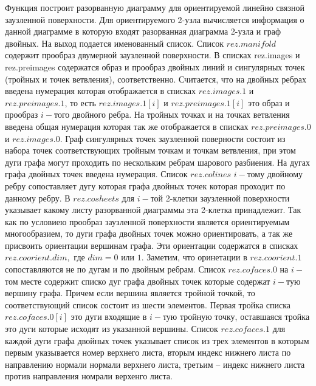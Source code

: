 \documentclass[a4paper,11pt]{report}
\begin{document}
{{{ Функция
построит
разорванную
диаграмму
для
ориентируемой
линейно
связной
заузленной
поверхности.
Для
ориентируемого
2-узла
вычисляется
информация
о
данной
диаграмме
в
которую
входят
разорванная
диаграмма
2-узла и
граф
двойных.
На
выход
подается
именованный
список.
Список $rez.manifold$ содержит
прообраз
двумерной
заузленной
поверхности.
В
списках
rez.images и rez.preimages
содержатся
образ
и
прообраз
двойных
линий
и
сингулярных
точек
(тройных
и
точек
ветвления),
соответственно.
Считается,
что на
двойных
ребрах
введена
нумерация
которая
отображается
в
списках $rez.images.1$ и $rez.preimages.1$, то
есть $rez.images.1[i]$ и $rez.preimages.1[i]$ это
образ
и
прообраз $i-$того
двойного
ребра.
На
тройных
точках
и на
точках
ветвления
введена
общая
нумерация
которая
так же
отображается
в
списках $rez.preimages.0$ и $rez.images.0.$ Граф
сингулярных
точек
заузленной
поверности
состоит
из
набора
точек
соответствующих
тройным
точкам
и
точкам
ветвления,
при
этом
дуги
графа
могут
проходить
по
нескольким
ребрам
шарового
разбиения.
На
дугах
графа
двойных
точек
введена
нумерация.
Список $rez.colines$ $i-$тому
двойному
ребру
сопоставляет
дугу
которая
графа
двойных
точек
которая
проходит
по
данному
ребру.
В $rez.cosheets$ для $i-$той
2-клетки
заузленной
поверхности
указывает
какому
листу
разорванной
диаграммы
эта
2-клетка
принадлежит.
Так
как по
условиею
прообраз
заузленной
поверхности
является
ориентируемым
многообразием,
то
дуги
графа
двойных
точек
можно
ориентировать,
а так
же
присвоить
ориентации
вершинам
графа.
Эти
ориентации
содержатся
в
списках $rez.coorient.dim,$ где $dim=0$ или $1.$ Заметим,
что
оринетации
в $rez.coorient.1$ сопоставляются
не по
дугам
и по
двойным
ребрам.
Список $rez.cofaces.0$ на $i-$том
месте
содержит
списко
дуг
графа
двойных
точек
которые
содержат $i-$тую
вершину
графа.
Причем
если
вершина
является
тройной
точкой,
то
соответствующий
список
состоит
из
шести
элементов.
Первая
тройка
списка $rez.cofaces.0[i]$ это
дуги
входящие
в $i-$тую
тройную
точку,
оставшаяся
тройка
это
дуги
которые
исходят
из
указанной
вершины.
Список $rez.cofaces.1$ для
каждой
дуги
графа
двойных
точек
указывает
список
из
трех
элементов
в
которым
первым
указывается
номер
верхнего
листа,
вторым
индекс
нижнего
листа
по
направлению
нормали
нормали
верхнего
листа,
третьим
--
индекс
нижнего
листа
против
направления
номрали
верхенго
листа. }

 }

 }

 
\end{document}
